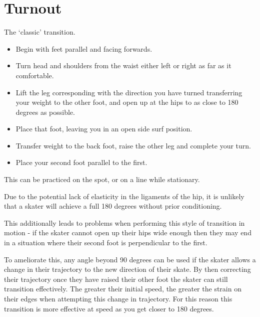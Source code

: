\section{Turnout}
\label{sec:transitions/turnout}

The `classic' transition.

\begin{itemize}
\item Begin with feet parallel and facing forwards. 
\item Turn head and shoulders from the waist either left or right as far as it comfortable.   
\item Lift the leg corresponding with the direction you have turned transferring your weight to the other foot, and open up at the hips to as close to 180 degrees as possible.     
\item Place that foot, leaving you in an open side surf position.  
\item Transfer weight to the back foot, raise the other leg and complete your turn.   
\item Place your second foot parallel to the first. 
\end{itemize}

This can be practiced on the spot, or on a line while stationary. 

Due to the potential lack of elasticity in the ligaments of the hip, it is unlikely that a skater will achieve a full 180 degrees without prior conditioning.

This additionally leads to problems when performing this style of transition in motion - if the skater cannot open up their hips wide enough then they may end in a situation where their second foot is perpendicular to the first.

To ameliorate this, any angle beyond 90 degrees can be used if the skater allows a change in their trajectory to the new direction of their skate.
By then correcting their trajectory once they have raised their other foot the skater can still transition effectively.   
The greater their initial speed, the greater the strain on their edges when attempting this change in trajectory. 
For this reason this transition is more effective at speed as you get closer to 180 degrees.
